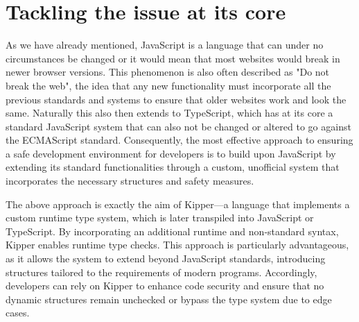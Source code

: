 \section{Tackling the issue at its core}

As we have already mentioned, JavaScript is a language that can under no circumstances be changed or it would mean that most websites would break in newer browser versions. This phenomenon is also often described as "Do not break the web", the idea that any new functionality must incorporate all the previous standards and systems to ensure that older websites work and look the same. Naturally this also then extends to TypeScript, which has at its core a standard JavaScript system that can also not be changed or altered to go against the ECMAScript standard. Consequently, the most effective approach to ensuring a safe development environment for developers is to build upon JavaScript by extending its standard functionalities through a custom, unofficial system that incorporates the necessary structures and safety measures.

The above approach is exactly the aim of Kipper—a language that implements a custom runtime type system, which is later \gls{transpile}d into JavaScript or TypeScript. By incorporating an additional runtime and non-standard syntax, Kipper enables runtime type checks. This approach is particularly advantageous, as it allows the system to extend beyond JavaScript standards, introducing structures tailored to the requirements of modern programs. Accordingly, developers can rely on Kipper to enhance code security and ensure that no dynamic structures remain unchecked or bypass the type system due to edge cases.

